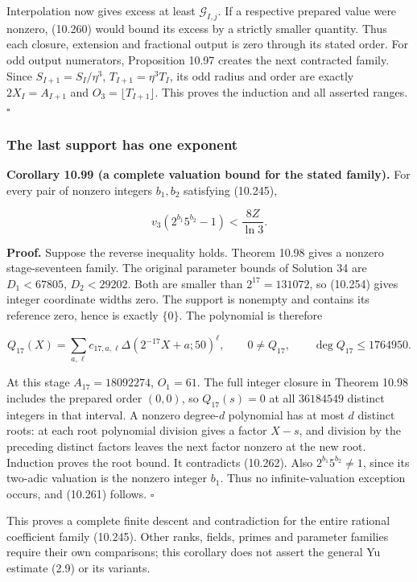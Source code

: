 \documentclass[
  11pt,
  a4paper,
]{article}
\newcounter{none} %
\begin{document}
Interpolation now gives excess at least \(\mathcal G_{I,j}\). If a
respective prepared value were nonzero, (10.260) would bound its excess
by a strictly smaller quantity. Thus each closure, extension and
fractional output is zero through its stated order. For odd output
numerators, Proposition 10.97 creates the next contracted family. Since
\(S_{I+1}=S_I/\eta^3\), \(T_{I+1}=\eta^3T_I\), its odd radius and order
are exactly \(2X_I=A_{I+1}\) and \(O_3=\lfloor T_{I+1}\rfloor\). This
proves the induction and all asserted ranges. \(\square\)

\subsubsection{The last support has one
exponent}\label{the-last-support-has-one-exponent}

\textbf{Corollary 10.99 (a complete valuation bound for the stated
family).} For every pair of nonzero integers \(b_1,b_2\) satisfying
(10.245),

\[
v_3(2^{b_1}5^{b_2}-1)<\frac{8Z}{\ln3}.
\tag{10.261}
\]

\textbf{Proof.} Suppose the reverse inequality holds. Theorem 10.98
gives a nonzero stage-seventeen family. The original parameter bounds of
Solution 34 are \(D_1<67805\), \(D_2<29202\). Both are smaller than
\(2^{17}=131072\), so (10.254) gives integer coordinate widths zero. The
support is nonempty and contains its reference zero, hence is exactly
\(\{0\}\). The polynomial is therefore

\[
Q_{17}(X)=\sum_{a,\ell}c_{17,a,\ell}
\Delta(2^{-17}X+a;50)^\ell,\qquad
0\ne Q_{17},\qquad \deg Q_{17}\le1764950.
\tag{10.262}
\]

At this stage \(A_{17}=18092274\), \(O_1=61\). The full integer closure
in Theorem 10.98 includes the prepared order \((0,0)\), so
\(Q_{17}(s)=0\) at all \(36184549\) distinct integers in that interval.
A nonzero degree-\(d\) polynomial has at most \(d\) distinct roots: at
each root polynomial division gives a factor \(X-s\), and division by
the preceding distinct factors leaves the next factor nonzero at the new
root. Induction proves the root bound. It contradicts (10.262). Also
\(2^{b_1}5^{b_2}\ne1\), since its two-adic valuation is the nonzero
integer \(b_1\). Thus no infinite-valuation exception occurs, and
(10.261) follows. \(\square\)

This proves a complete finite descent and contradiction for the entire
rational coefficient family (10.245). Other ranks, fields, primes and
parameter families require their own comparisons; this corollary does
not assert the general Yu estimate (2.9) or its variants.
\end{document}
